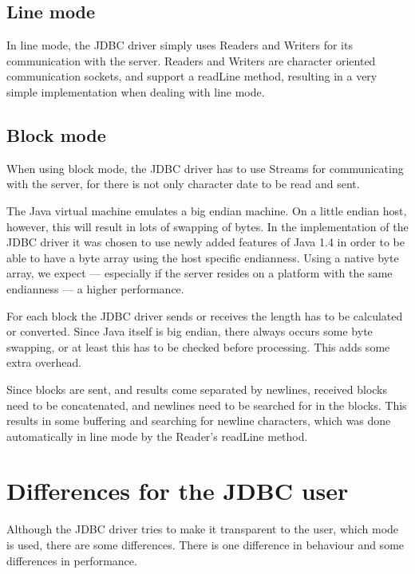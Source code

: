 \documentclass{article}
\begin{document}
\subsection{Line mode}

In line mode, the JDBC driver simply uses \textsf{Reader}s and
\textsf{Writer}s for its communication with the server. \textsf{Reader}s
and \textsf{Writer}s are character oriented communication sockets,
and support a \textsf{readLine} method, resulting in a very
simple implementation when dealing with line mode.


\subsection{Block mode}

When using block mode, the JDBC driver has to use \textsf{Stream}s
for communicating with the server, for there is not only character date
to be read and sent.

The Java virtual machine emulates a big endian machine. On a little
endian host, however, this will result in lots of swapping of bytes.
In the implementation of the JDBC driver it was chosen to use newly
added features of Java 1.4 in order to be able to have a byte array
using the host specific endianness. Using a native byte array, we
expect --- especially if the server resides on a platform with the same
endianness --- a higher performance.

For each block the JDBC driver sends or receives the length has
to be calculated or converted. Since Java itself is big endian, there
always occurs some byte swapping, or at least this has to be checked
before processing. This adds some extra overhead.

Since blocks are sent, and results come separated by newlines,
received blocks need to be concatenated, and newlines need to be
searched for in the blocks. This results in some buffering and
searching for newline characters, which was done automatically
in line mode by the \textsf{Reader}'s \textsf{readLine} method.


\section{Differences for the JDBC user}

Although the JDBC driver tries to make it transparent to the user, which
mode is used, there are some differences. There is one difference in
behaviour and some differences in performance.
\end{document}
